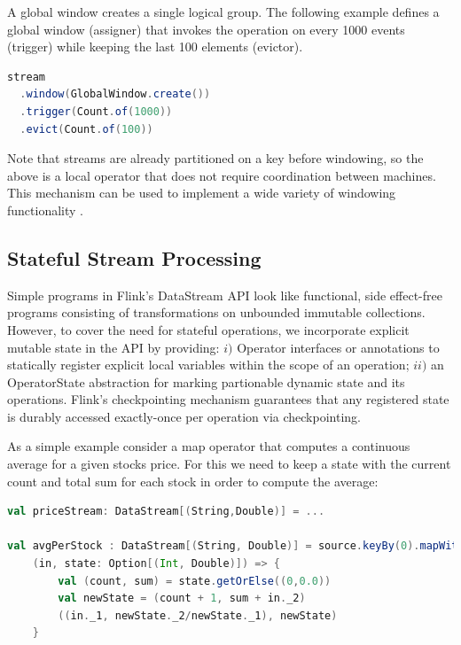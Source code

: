 A global window creates a single logical group. The following example defines a global window (assigner) that invokes the operation on every 1000 events (trigger) while keeping the last 100 elements (evictor). 

\begin{lstlisting}[language=Java]
stream
  .window(GlobalWindow.create())
  .trigger(Count.of(1000))
  .evict(Count.of(100))
\end{lstlisting}

Note that streams are already partitioned on a key before windowing, so the above is a local operator that does not require coordination between machines. This mechanism can be used to implement a wide variety of windowing functionality \cite{akidau2015dataflow}. 


\subsection{Stateful Stream Processing}

Simple programs in Flink’s DataStream API look like functional, side effect-free programs consisting of transformations on unbounded immutable collections. However, to cover the need for stateful operations, we incorporate explicit mutable state in the API by providing: $i)$ Operator interfaces or annotations to statically register explicit local variables within the scope of an operation;  $ii)$ an OperatorState abstraction for marking partionable dynamic state and its operations.  Flink’s checkpointing mechanism guarantees that any registered state is durably accessed exactly-once per operation via checkpointing. 

As a simple example consider a map operator that computes a continuous average for a given stocks price. For this we need to keep a state with the current count and total sum for each stock in order to compute the average:


\begin{lstlisting}[language=Scala]
val priceStream: DataStream[(String,Double)] = ...
 
val avgPerStock : DataStream[(String, Double)] = source.keyBy(0).mapWithState(
    (in, state: Option[(Int, Double)]) => {
		val (count, sum) = state.getOrElse((0,0.0))
		val newState = (count + 1, sum + in._2)
		((in._1, newState._2/newState._1), newState)
	}
\end{lstlisting}

